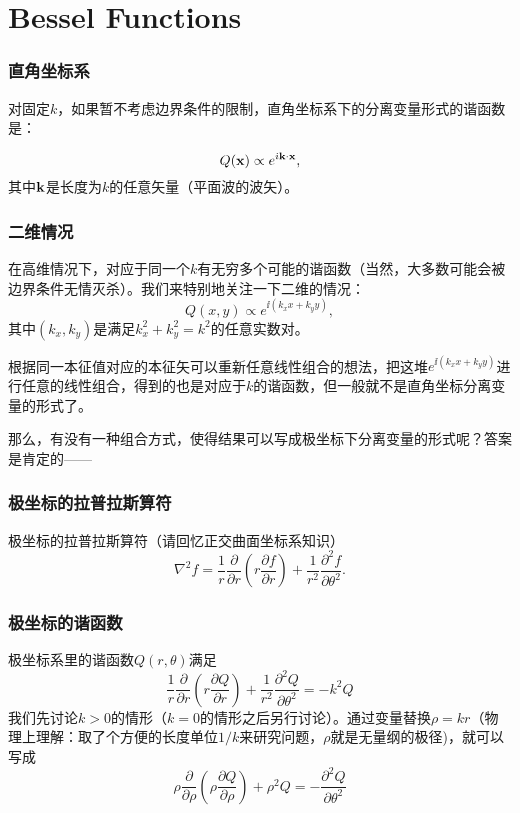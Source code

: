 \documentclass[CJK]{beamer}
\begin{document}
\section{Bessel Functions}

\begin{frame}
\frametitle{直角坐标系}

对固定$k$，如果暂不考虑边界条件的限制，直角坐标系下的分离变量形式的谐函数是：

$$Q({\mathbf{x}}) \propto e^{{\dot{\imath}} {\mathbf{k}}\cdot {\mathbf{x}}}, $$
其中${\mathbf{k}}$是长度为$k$的任意矢量（平面波的波矢）。



\end{frame}



\begin{frame}
\frametitle{二维情况}

在高维情况下，对应于同一个$k$有无穷多个可能的谐函数（当然，大多数可能会被边界条件无情灭杀）。我们来特别地关注一下二维的情况：
$$Q(x, y) \propto e^{\ii (k_xx+k_yy)}, $$
其中$(k_x, k_y)$是满足$k_x^2+k_y^2 = k^2$的任意实数对。

\skiplines

根据同一本征值对应的本征矢可以重新任意线性组合的想法，把这堆$e^{\ii (k_xx+k_yy)}$进行任意的线性组合，得到的也是对应于$k$的谐函数，但一般就不是直角坐标分离变量的形式了。

那么，有没有一种组合方式，使得结果可以写成极坐标下分离变量的形式呢？答案是肯定的——

\end{frame}


\begin{frame}
  \frametitle{极坐标的拉普拉斯算符}
  
  极坐标的拉普拉斯算符（请回忆正交曲面坐标系知识）
$$ \nabla^2 f =  \frac{1}{r} \frac{\partial}{\partial r} \left(r\frac{\partial f}{\partial r}\right) + \frac{1}{r^2}\frac{\partial^2 f}{\partial \theta^2}.  $$
  
\end{frame}



\begin{frame}
  \frametitle{极坐标的谐函数}
  
  极坐标系里的谐函数$Q(r,\theta)$满足
  $$\frac{1}{r} \frac{\partial}{\partial r} \left(r\frac{\partial Q}{\partial r}\right) + \frac{1}{r^2}\frac{\partial^2 Q}{\partial \theta^2} = -k^2 Q $$
  我们先讨论$k>0$的情形（$k=0$的情形之后另行讨论）。通过变量替换$ \rho = kr$（物理上理解：取了个方便的长度单位$1/k$来研究问题，$\rho$就是无量纲的极径)，就可以写成
  $$\rho \frac{\partial}{\partial \rho} \left(\rho\frac{\partial Q}{\partial \rho}\right)+\rho^2Q = - \frac{\partial^2 Q}{\partial \theta^2}  $$    
    
\end{frame}
\end{document}
